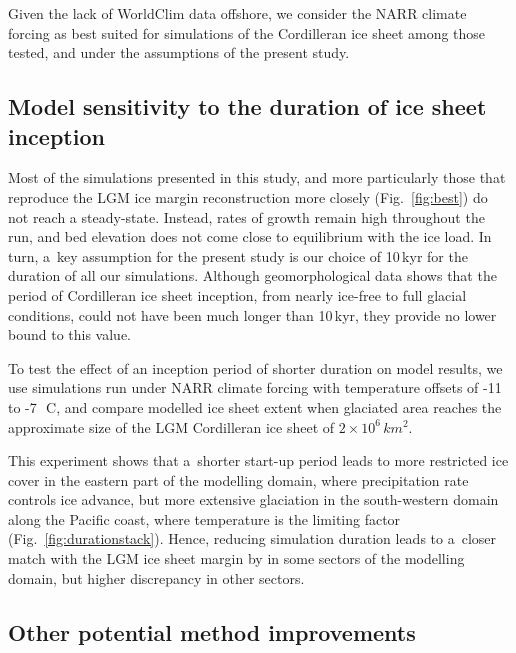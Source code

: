 \documentclass[tc, ms]{copernicus}
\begin{document}
Given the lack of WorldClim data offshore, we consider the NARR climate forcing as best suited for simulations of the Cordilleran ice sheet among those tested, and under the assumptions of the present study.

\subsection{Model sensitivity to the duration of ice sheet inception}

Most of the simulations presented in this study, and more particularly those that reproduce the LGM ice margin reconstruction more closely (Fig.~\ref{fig:best}) do not reach a steady-state. Instead, rates of growth remain high throughout the run, and bed elevation does not come close to equilibrium with the ice load. In turn, a~key assumption for the present study is our choice of 10\,kyr for the duration of all our simulations. Although geomorphological data shows that the period of Cordilleran ice sheet inception, from nearly ice-free to full glacial conditions, could not have been much longer than 10\,kyr, they provide no lower bound to this value.

To test the effect of an inception period of shorter duration on model results, we use simulations run under NARR climate forcing with temperature offsets of -11 to -7\,\unit{{\degree}C}, and compare modelled ice sheet extent when glaciated area reaches the approximate size of the LGM Cordilleran ice sheet of $2\times 10^6\,\unit{km^2}$.

This experiment shows that a~shorter start-up period leads to more restricted ice cover in the eastern part of the modelling domain, where precipitation rate controls ice advance, but more extensive glaciation in the south-western domain along the Pacific coast, where temperature is the limiting factor (Fig.~\ref{fig:durationstack}). Hence, reducing simulation duration leads to a~closer match with the LGM ice sheet margin by \citet{dyke-2004} in some sectors of the modelling domain, but higher discrepancy in other sectors.

\subsection{Other potential method improvements}
\end{document}
